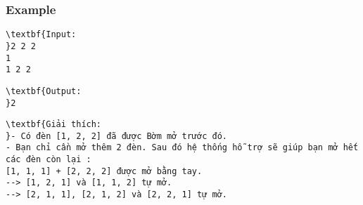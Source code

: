 \subsubsection{Example}
\begin{verbatim}
\textbf{Input:
}2 2 2
1
1 2 2\end{verbatim}
\begin{verbatim}
\textbf{Output:
}2\end{verbatim}
\begin{verbatim}
\textbf{Giải thích:
}- Có đèn [1, 2, 2] đã được Bờm mở trước đó.
- Bạn chỉ cần mở thêm 2 đèn. Sau đó hệ thống hỗ trợ sẽ giúp bạn mở hết các đèn còn lại :
[1, 1, 1] + [2, 2, 2] được mở bằng tay.
--> [1, 2, 1] và [1, 1, 2] tự mở.
--> [2, 1, 1], [2, 1, 2] và [2, 2, 1] tự mở.
\end{verbatim}
